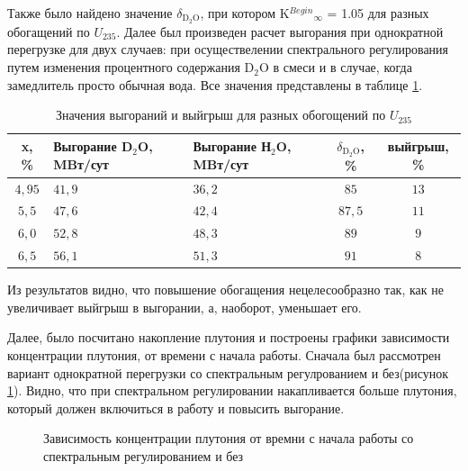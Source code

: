 \documentclass[a4paper]{article}
\begin{document}
	Также было найдено значение $\delta_{\text{D}_{2}\text{O}}$, при котором K$^{Begin}$$_{\infty}$ = 1.05 для разных обогащений по $U_{235}$. Далее был произведен расчет выгорания при однократной перегрузке для двух случаев: при осуществелении спектрального регулирования путем изменения процентного содержания D$_2$O в смеси и в случае, когда замедлитель просто обычная вода. 
	Все значения представлены в таблице \ref{table:vygoranie1}.
	
	\begin{table}[h]
		\caption{Значения выгораний и выйгрыш для разных обогощений по $U_{235}$}
		\label{table:vygoranie1}
		\begin{center}
			\begin{tabular}{|c |p{100pt} | p{100pt} | c | c |}
				\hline
				x, \% & Выгорание  D$_2$O, MBт/сут &Выгорание  Н$_2$O, MBт/сут & $\delta_{\text{D}_{2}\text{O}}$, \%  & выйгрыш, \% \\ 
				\hline
				$4,95$ &  $41,9$ & $36,2$ & $85$ & $13$ \\
				\hline
				$5,5$ &  $47,6$ & $42,4$ & $87,5$  & $11$ \\
				\hline
				$6,0$ &  $52,8$ & $48,3$ & $89$ & $9$ \\
				\hline
				$6,5$ &  $56,1$ & $51,3$ & $91$ & $8$ \\
				\hline				
			\end{tabular}
		\end{center}
	\end{table}

	Из результатов видно, что повышение обогащения нецелесообразно так, как не увеличивает выйгрыш в выгорании, а, наоборот, уменьшает его.
	
	Далее, было посчитано накопление плутония и построены графики зависимости концентрации плутония, от времени с начала работы. Сначала был рассмотрен вариант однократной перегрузки со спектральным регулрованием и без(рисунок \ref{ris:pu1}). Видно, что при спектральном регулировании накапливается больше плутония, который должен включиться в работу и повысить выгорание.
	
	\begin{figure}[h]
		\caption{Зависимость концентрации плутония от времни с начала работы со спектральным регулированием и без}
		\label{ris:pu1}
	\end{figure}
	
\end{document}
